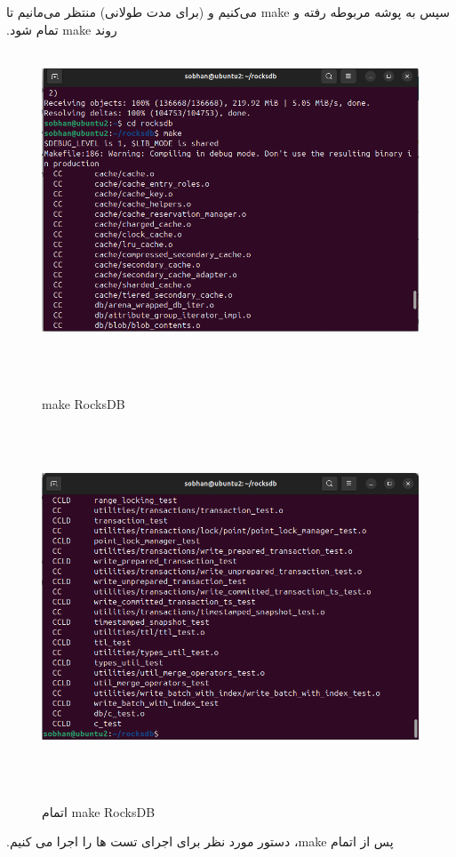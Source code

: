 ‫
‫سپس به پوشه مربوطه رفته و make می‌کنیم و (برای مدت طولانی) منتظر می‌مانیم تا روند make تمام شود.
‫
‫\begin{figure}[H]
‫    \centering
‫    \includegraphics[width=\textwidth]{figs/2.png}
‫    \caption{make RocksDB}
‫\end{figure}
‫
‫\begin{figure}[H]
‫    \centering
‫    \includegraphics[width=\textwidth]{figs/3.png}
‫    \caption{اتمام make RocksDB}
‫\end{figure}
‫
‫پس از اتمام make، دستور مورد نظر برای اجرای تست ها را اجرا می کنیم.

